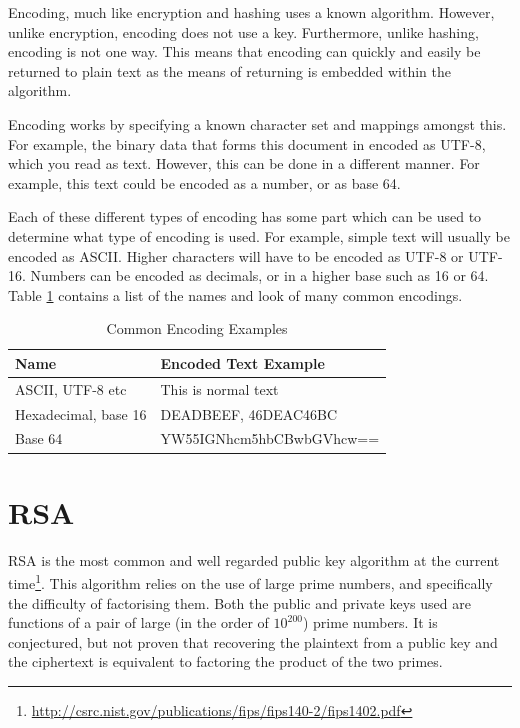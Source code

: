 				Encoding, much like encryption and hashing uses a known algorithm. 
				However, unlike encryption, encoding does not use a key. 
				Furthermore, unlike hashing, encoding is not one way. 
				This means that encoding can quickly and easily be returned to plain text as the means of returning is embedded within the algorithm.

				Encoding works by specifying a known character set and mappings amongst this. 
				For example, the binary data that forms this document in encoded as UTF-8, which you read as text. 
				However, this can be done in a different manner. 
				For example, this text could be encoded as a number, or as base 64. 

				Each of these different types of encoding has some part which can be used to determine what type of encoding is used. 
				For example, simple text will usually be encoded as ASCII. 
				Higher characters will have to be encoded as UTF-8 or UTF-16. 
				Numbers can be encoded as decimals, or in a higher base such as 16 or 64. 
				Table \ref{tab:Encodings} contains a list of the names and look of many common encodings. 
				\begin{table}[htb]
					\centering
				\begin{adjustbox}{max width=1\textwidth}
					\begin{tabular}{| l | l |}
						\hline
						\textbf{Name} & \textbf{Encoded Text Example} \\ \hline
						ASCII, UTF-8 etc & This is normal text \\ \hline
						Hexadecimal, base 16 & DEADBEEF, 46DEAC46BC \\ \hline
						Base 64 & YW55IGNhcm5hbCBwbGVhcw== \\ \hline
					\end{tabular}
				\end{adjustbox}
					\caption{Common Encoding Examples}
					\label{tab:Encodings}
				\end{table}
	\section{RSA}
		RSA is the most common and well regarded public key algorithm at the current time\footnote{\url{http://csrc.nist.gov/publications/fips/fips140-2/fips1402.pdf}}. 
		This algorithm relies on the use of large prime numbers, and specifically the difficulty of factorising them. 
		Both the public and private keys used are functions of a pair of large (in the order of $10^{200}$) prime numbers. 
		It is conjectured, but not proven that recovering the plaintext from a public key and the ciphertext is equivalent to factoring the product of the two primes. 


